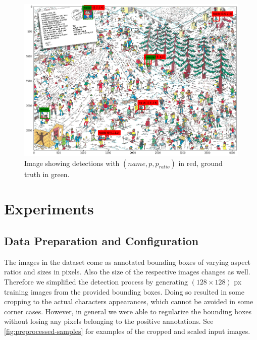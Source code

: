 \documentclass[11pt]{article}
\begin{document}
\begin{figure}[h]
    \centering
    \includegraphics[width=0.8\linewidth]{figures/waldo_winter}
    \caption{Image showing detections with \( (name, p, p_{ratio}) \) in red, ground truth in green.}
    \label{fig:waldo-winter}
\end{figure}

\section{Experiments}
\subsection{Data Preparation and Configuration}\label{subsec:data-prep}

The images in the dataset come as annotated bounding boxes of varying aspect ratios and sizes in pixels.
Also the size of the respective images changes as well. Therefore we simplified the detection process by
generating \( (128 \times 128) \) px training images from the provided bounding boxes.
Doing so resulted in some cropping to the actual characters appearances, which cannot be avoided in some corner cases.
However, in general we were able to regularize the bounding boxes without losing any pixels belonging to the positive annotations.
See \autoref{fig:preprocessed-samples} for examples of the cropped and scaled input images.
\end{document}
